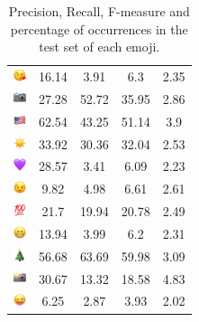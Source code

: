 \documentclass{article}
\begin{document}
\begin{table}
\begin{tabular}{|c|ccc|c|}
\includegraphics[height=0.37cm,width=0.37cm]{img/face_blowing_a_kiss.png} & 16.14 & 3.91 & 6.3 & 2.35\\ 
\includegraphics[height=0.37cm,width=0.37cm]{img/camera.png} & 27.28 & 52.72 & 35.95 & 2.86\\ 
\includegraphics[height=0.37cm,width=0.37cm]{img/United_States.png} & 62.54 & 43.25 & 51.14 & 3.9\\ 
\includegraphics[height=0.37cm,width=0.37cm]{img/sun.png} & 33.92 & 30.36 & 32.04 & 2.53\\ 
\includegraphics[height=0.37cm,width=0.37cm]{img/purple_heart.png} & 28.57 & 3.41 & 6.09 & 2.23\\ 
\includegraphics[height=0.37cm,width=0.37cm]{img/winking_face.png} & 9.82 & 4.98 & 6.61 & 2.61\\ 
\includegraphics[height=0.37cm,width=0.37cm]{img/hundred_points.png} & 21.7 & 19.94 & 20.78 & 2.49\\ 
\includegraphics[height=0.37cm,width=0.37cm]{img/beaming_face_with_smiling_eyes.png} & 13.94 & 3.99 & 6.2 & 2.31\\ 
\includegraphics[height=0.37cm,width=0.37cm]{img/Christmas_tree.png} & 56.68 & 63.69 & 59.98 & 3.09\\ 
\includegraphics[height=0.37cm,width=0.37cm]{img/camera_with_flash.png} & 30.67 & 13.32 & 18.58 & 4.83\\ 
\includegraphics[height=0.37cm,width=0.37cm]{img/winking_face_with_tongue.png} & 6.25 & 2.87 & 3.93 & 2.02\\ 

\hline
\end{tabular}
\caption{\label{table:emoji_detailed} Precision, Recall, F-measure and percentage of occurrences in the test set of each emoji.}
\end{table}
\end{document}
